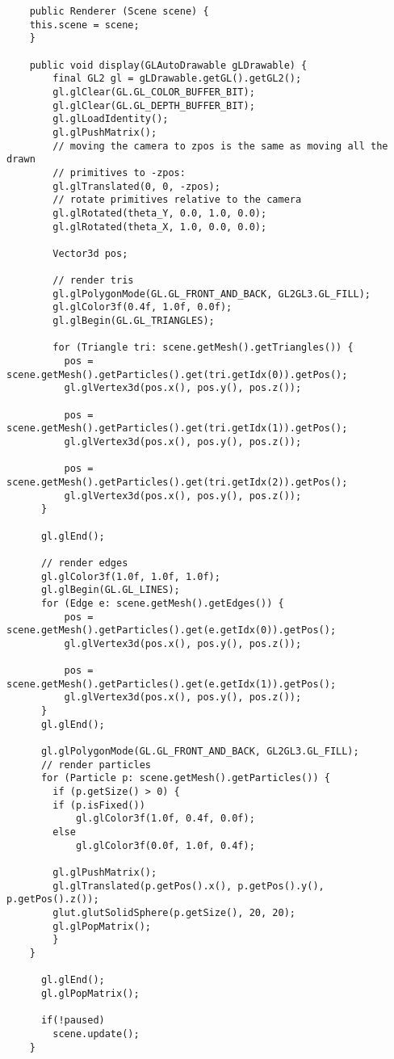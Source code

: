\begin{lstlisting}
    public Renderer (Scene scene) {
	this.scene = scene;
    }

    public void display(GLAutoDrawable gLDrawable) {
        final GL2 gl = gLDrawable.getGL().getGL2();
        gl.glClear(GL.GL_COLOR_BUFFER_BIT);
        gl.glClear(GL.GL_DEPTH_BUFFER_BIT);
        gl.glLoadIdentity();
		gl.glPushMatrix();
		// moving the camera to zpos is the same as moving all the drawn
	    // primitives to -zpos:
	    gl.glTranslated(0, 0, -zpos);
	    // rotate primitives relative to the camera
	    gl.glRotated(theta_Y, 0.0, 1.0, 0.0);
	    gl.glRotated(theta_X, 1.0, 0.0, 0.0);
      
	    Vector3d pos;
		
	    // render tris
	    gl.glPolygonMode(GL.GL_FRONT_AND_BACK, GL2GL3.GL_FILL);
	    gl.glColor3f(0.4f, 1.0f, 0.0f);
	    gl.glBegin(GL.GL_TRIANGLES);

	    for (Triangle tri: scene.getMesh().getTriangles()) {
	      pos = scene.getMesh().getParticles().get(tri.getIdx(0)).getPos();
	      gl.glVertex3d(pos.x(), pos.y(), pos.z());

	      pos = scene.getMesh().getParticles().get(tri.getIdx(1)).getPos();
	      gl.glVertex3d(pos.x(), pos.y(), pos.z());

	      pos = scene.getMesh().getParticles().get(tri.getIdx(2)).getPos();
	      gl.glVertex3d(pos.x(), pos.y(), pos.z());
	  }

	  gl.glEnd();
		
	  // render edges
	  gl.glColor3f(1.0f, 1.0f, 1.0f);
	  gl.glBegin(GL.GL_LINES);
	  for (Edge e: scene.getMesh().getEdges()) {
	      pos = scene.getMesh().getParticles().get(e.getIdx(0)).getPos();
	      gl.glVertex3d(pos.x(), pos.y(), pos.z());

	      pos = scene.getMesh().getParticles().get(e.getIdx(1)).getPos();
	      gl.glVertex3d(pos.x(), pos.y(), pos.z());
	  }
	  gl.glEnd();
		
	  gl.glPolygonMode(GL.GL_FRONT_AND_BACK, GL2GL3.GL_FILL);
	  // render particles
	  for (Particle p: scene.getMesh().getParticles()) {
	    if (p.getSize() > 0) {
		if (p.isFixed())
		    gl.glColor3f(1.0f, 0.4f, 0.0f);
		else
		    gl.glColor3f(0.0f, 1.0f, 0.4f);
			
		gl.glPushMatrix();
		gl.glTranslated(p.getPos().x(), p.getPos().y(), p.getPos().z());
		glut.glutSolidSphere(p.getSize(), 20, 20);
		gl.glPopMatrix();
	    }
	}

	  gl.glEnd();
	  gl.glPopMatrix();
      
	  if(!paused)
	    scene.update();
    }
 

\end{lstlisting}
